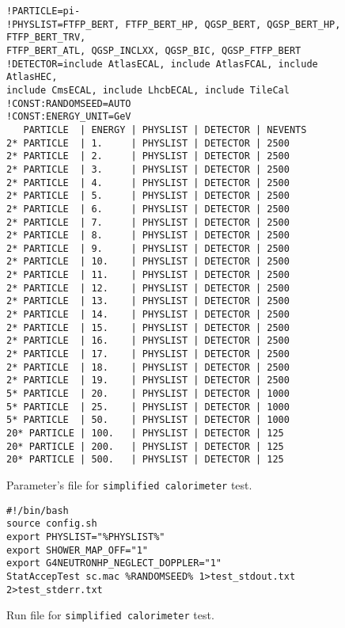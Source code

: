 \begin{figure}
\begin{verbatim}
!PARTICLE=pi-
!PHYSLIST=FTFP_BERT, FTFP_BERT_HP, QGSP_BERT, QGSP_BERT_HP,  FTFP_BERT_TRV,
FTFP_BERT_ATL, QGSP_INCLXX, QGSP_BIC, QGSP_FTFP_BERT
!DETECTOR=include AtlasECAL, include AtlasFCAL, include AtlasHEC,
include CmsECAL, include LhcbECAL, include TileCal
!CONST:RANDOMSEED=AUTO
!CONST:ENERGY_UNIT=GeV
   PARTICLE  | ENERGY | PHYSLIST | DETECTOR | NEVENTS
2* PARTICLE  | 1.     | PHYSLIST | DETECTOR | 2500
2* PARTICLE  | 2.     | PHYSLIST | DETECTOR | 2500
2* PARTICLE  | 3.     | PHYSLIST | DETECTOR | 2500
2* PARTICLE  | 4.     | PHYSLIST | DETECTOR | 2500
2* PARTICLE  | 5.     | PHYSLIST | DETECTOR | 2500
2* PARTICLE  | 6.     | PHYSLIST | DETECTOR | 2500
2* PARTICLE  | 7.     | PHYSLIST | DETECTOR | 2500
2* PARTICLE  | 8.     | PHYSLIST | DETECTOR | 2500
2* PARTICLE  | 9.     | PHYSLIST | DETECTOR | 2500
2* PARTICLE  | 10.    | PHYSLIST | DETECTOR | 2500
2* PARTICLE  | 11.    | PHYSLIST | DETECTOR | 2500
2* PARTICLE  | 12.    | PHYSLIST | DETECTOR | 2500
2* PARTICLE  | 13.    | PHYSLIST | DETECTOR | 2500
2* PARTICLE  | 14.    | PHYSLIST | DETECTOR | 2500
2* PARTICLE  | 15.    | PHYSLIST | DETECTOR | 2500
2* PARTICLE  | 16.    | PHYSLIST | DETECTOR | 2500
2* PARTICLE  | 17.    | PHYSLIST | DETECTOR | 2500
2* PARTICLE  | 18.    | PHYSLIST | DETECTOR | 2500
2* PARTICLE  | 19.    | PHYSLIST | DETECTOR | 2500
5* PARTICLE  | 20.    | PHYSLIST | DETECTOR | 1000
5* PARTICLE  | 25.    | PHYSLIST | DETECTOR | 1000
5* PARTICLE  | 50.    | PHYSLIST | DETECTOR | 1000
20* PARTICLE | 100.   | PHYSLIST | DETECTOR | 125
20* PARTICLE | 200.   | PHYSLIST | DETECTOR | 125
20* PARTICLE | 500.   | PHYSLIST | DETECTOR | 125
\end{verbatim}
\caption{Parameter's file for {\tt simplified calorimeter} test.}
\label{sc-parameters}
\end{figure}


\begin{figure}

\begin{verbatim}
#!/bin/bash
source config.sh
export PHYSLIST="%PHYSLIST%"
export SHOWER_MAP_OFF="1"
export G4NEUTRONHP_NEGLECT_DOPPLER="1"
StatAccepTest sc.mac %RANDOMSEED% 1>test_stdout.txt 2>test_stderr.txt
\end{verbatim}
\caption{Run file for {\tt simplified calorimeter} test.}
\label{sc-run}
\end{figure}